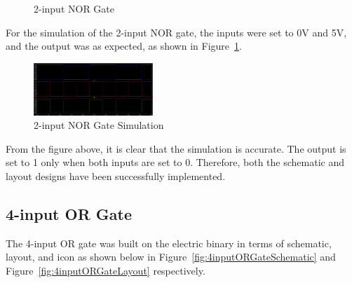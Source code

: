 \documentclass[conference]{IEEEtran}
\begin{document}
\begin{figure}[h]
    \centering
    \hfill
    \caption{2-input NOR Gate}
\end{figure}

For the simulation of the 2-input NOR gate, the inputs were set to 0V and 5V, and the output was as expected, as shown in Figure~\ref{fig:2inputNORGateSimulation}.
\begin{figure}[h]
    \centering
    \includegraphics[width=0.4\textwidth]{assets/2inputNORGateSimulation.png}
    \caption{2-input NOR Gate Simulation}
    \label{fig:2inputNORGateSimulation}
\end{figure}

From the figure above, it is clear that the simulation is accurate. The output is set to 1 only when both inputs are set to 0. Therefore, both the schematic and layout designs have been successfully implemented.

\subsection{4-input OR Gate}
The 4-input OR gate was built on the electric binary in terms of schematic, layout, and icon as shown below in Figure~\ref{fig:4inputORGateSchematic} and Figure~\ref{fig:4inputORGateLayout} respectively.
\end{document}
